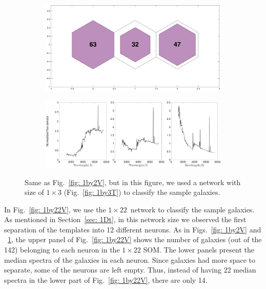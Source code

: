             \begin{figure}
                \begin{subfigure}[b]{0.5\textwidth}
                    \centering
                    \includegraphics[width=\textwidth]{images0.01/1d/hit_v_1_by_3.png}
                \end{subfigure}
                \hfill
                \begin{subfigure}[b]{0.5\textwidth}
                     \includegraphics[width=\textwidth]{images0.01/1d/SED_total1by3_fluxdensity.png}
                \end{subfigure}
                \caption[Classification of fitted galaxy SEDs from \citet{Hossein12} using the $1\times3$~networks]{Same as Fig.~\ref{fig: 1by2V}, but in this figure, we used a network with size of $1\times3$ (Fig.~\ref{fig: 1by3T}) to classify the sample galaxies.}
                \label{fig: 1by3V}
            \end{figure}       
            
            In Fig.~\ref{fig: 1by22V}, we use the $1\times22$~network to classify the sample galaxies.
            As mentioned in Section~\ref{sec: 1Dt}, in this network size we observed the first separation of the  templates into 12 different neurons.
            As in Figs.~\ref{fig: 1by2V} and ~\ref{fig: 1by3V}, the upper panel of Fig.~\ref{fig: 1by22V} shows the number of galaxies (out of the 142) belonging to each neuron in the $1\times22$ SOM.
            The lower panels present the median spectra of the galaxies in each neuron.
            Since galaxies had more space to separate, some of the neurons are left empty.
            Thus, instead of having 22 median spectra in the lower part of Fig.~\ref{fig: 1by22V}, there are only 14.

